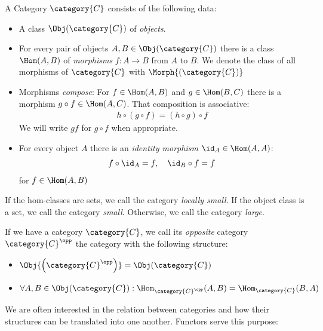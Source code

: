 \documentclass[DIN, pagenumber=false, fontsize=11pt, parskip=half, colorinlistoftodos, svgnames]{scrartcl}
\begin{document}
	\begin{definition}[Category]
		\label{def: cat}
		A Category $\category{C}$ consists of the following data: 
		\begin{itemize}
			\item 
				A class $\Obj(\category{C})$ of \emph{objects}.
			\item 
				For every pair of objects $A, B \in \Obj(\category{C})$ there is a class $\Hom(A, B)$ of \emph{morphisms} $f: A \rightarrow B$ from $A$ to $B$. 
				We denote the class of all morphisms of $\category{C}$ with $\Morph{(\category{C})}$
			\item 
				Morphisms \emph{compose}: For $f \in \Hom(A, B)$ and $g \in \Hom(B, C)$ there is a morphism $g \circ  f \in \Hom(A, C)$. 
				That composition is associative: 
				\begin{align*}
					h \circ (g \circ f) = (h \circ g) \circ f
				\end{align*}
				We will write $gf$ for $g\circ f$ when appropriate.
			\item 
				For every object $A$ there is an \emph{identity morphism} $\id_A \in \Hom(A, A)$:
				\begin{align*}
					f \circ \id_A = f, \quad \id_B \circ f = f
				\end{align*}
				for $f \in \Hom(A, B)$
		\end{itemize}
		If the hom-classes are sets, we call the category \emph{locally small}. If the object class is a set, we call the category \emph{small}. Otherwise, we call the category \emph{large}.
		
		If we have a category $\category{C} $, we call its \emph{opposite} category $\category{C}^\opp $ the category with the following structure:
		\begin{itemize}
			\item $\Obj{\left(\category{C}^\opp \right)} = \Obj(\category{C}) $
			\item $\forall A, B \in \Obj(\category{C}): 
			\Hom_{\category{C}^\opp }(A,B) = \Hom_{\category{C}}(B,A)$
		\end{itemize}
	\end{definition}
	
	We are often interested in the relation between categories and how their structures can be translated into one another. Functors serve this purpose:
	
\end{document}
